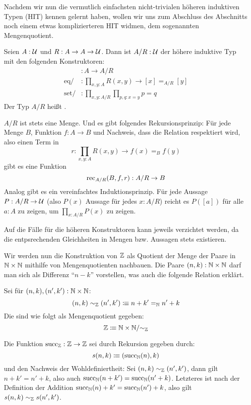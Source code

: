 Nachdem wir nun die vermutlich einfachsten nicht-trivialen höheren induktiven Typen (HIT) kennen gelernt haben,
wollen wir uns zum Abschluss des Abschnitts noch einem etwas komplizierteren HIT widmen,
dem sogenannten Mengenquotient.

\begin{regeln}
  Seien $A:\mathcal{U}$ und $R:A\to A\to \mathcal{U}$. Dann ist $A / R:\mathcal{U}$ der höhere induktive Typ mit den folgenden Konstruktoren:
  \begin{align*}
    [\_]&:A\to A / R \\
    \mathrm{eq /}&:\prod_{x,y:A}R(x,y)\to [x] =_{A / R} [y] \\
    \mathrm{set /}&:\prod_{x,y:A / R}\prod_{p,q : x=y}p=q
  \end{align*}
  Der Typ $A / R$ heißt .
\end{regeln}

\begin{bemerkung}
  $A / R$ ist stets eine Menge. Und es gibt folgendes Rekursionsprinzip:
  Für jede Menge $B$, Funktion $f:A\to B$ und Nachweis, dass die Relation respektiert wird,
  also einen Term in
  \[
    r:\prod_{x,y:A}R(x,y)\to f(x)=_B f(y)
  \]
  gibt es eine Funktion
  \[
    \mathrm{rec}_{A / R}(B,f,r) : A / R \to B
  \]
  Analog gibt es ein vereinfachtes Induktionsprinzip.
  Für jede Aussage $P:A / R \to \mathcal{U}$ (also $P(x)$ Aussage für jedes $x:A / R$) reicht es $P([a])$ für alle $a:A$ zu zeigen, um $\prod_{x:A / R}P(x)$ zu zeigen.
\end{bemerkung}
\begin{beweis}
  Auf die Fälle für die höheren Konstruktoren kann jeweils verzichtet werden, da die entpsrechenden Gleichheiten in Mengen bzw. Aussagen stets existieren.
\end{beweis}

Wir werden nun die Konstruktion von $\Z$ als Quotient der Menge der Paare in $\mathbb{N}\times \mathbb{N}$ mithilfe von Mengenquotienten nachbauen.
Die Paare $(n,k):\mathbb{N}\times\mathbb{N}$ darf man sich als Differenz ``$n-k$'' vorstellen, was auch die folgende Relation erklärt.

\begin{definition}
  Sei für $(n,k),(n',k'):\mathbb{N}\times\mathbb{N}$:
  \[
    (n,k) \sim_{\mathbb{Z}} (n',k')\vcentcolon\mspace{-1.2mu}\equiv n+k'=_{\mathbb{N}} n'+k
  \]
  Die \index{$\Z$} sind wie folgt als Mengenquotient gegeben:
  \[
    \mathbb{Z}\vcentcolon\mspace{-1.2mu}\equiv \mathbb{N}\times\mathbb{N} / {\sim_{\mathbb{Z}}}
  \]
\end{definition}

\begin{definition}
  Die Funktion $\mathrm{succ}_{\mathbb{Z}}:\mathbb{Z} \to \mathbb{Z}$ sei durch Rekursion gegeben durch:
  \[
    s(n,k)\vcentcolon\mspace{-1.2mu}\equiv (\mathrm{succ}_{\mathbb{N}}(n),k) 
  \]
  und den Nachweis der Wohldefiniertheit:
  Sei $(n,k)\sim_{\mathbb{Z}} (n',k')$, dann gilt $n+k'=n'+k$, also auch $\mathrm{succ}_{\mathbb{N}}(n+k')=\mathrm{succ}_{\mathbb{N}}(n'+k)$.
  Letzteres ist nach der Definition der Addition $\mathrm{succ}_{\mathbb{N}}(n)+k'=\mathrm{succ}_{\mathbb{N}}(n')+k$, also gilt $s(n,k)\sim_{\mathbb{Z}} s(n',k')$.
\end{definition}

